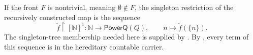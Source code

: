 \begin{definition}
If the front $F$ is nontrivial, meaning $\emptyset\notin F$, the singleton
restriction of the recursively constructed map is the sequence
\[
 \widetilde f\!\restriction[\mathbb N]^1:\mathbb N\to\mathsf{PowerQ}(Q),
 \qquad n\longmapsto
 \widetilde f(\{n\}).
\]
The singleton-tree membership needed here is supplied by
.  By , every term of
this sequence is in the hereditary countable carrier.
\end{definition}
